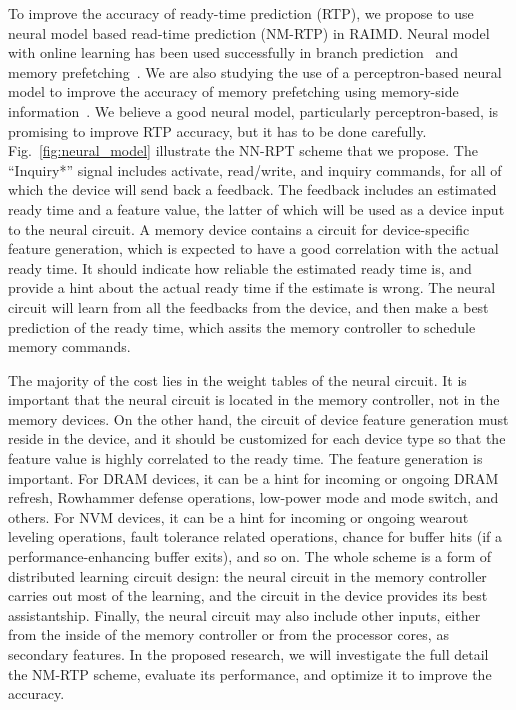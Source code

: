 \documentclass[11pt]{article}
\begin{document}
To improve the accuracy of ready-time prediction (RTP), we propose to use neural
model based read-time prediction (NM-RTP) in RAIMD.  Neural model with online
learning has been used successfully in branch prediction~\cite{} and memory
prefetching~\cite{}.  We are also studying the use of a perceptron-based neural
model to improve the accuracy of memory prefetching using memory-side
information~\cite{}.  We believe a good neural model, particularly
perceptron-based, is promising to improve RTP accuracy, but it has to be done
carefully.  Fig.~\ref{fig:neural_model} illustrate the NN-RPT scheme that we
propose.  The ``Inquiry*'' signal includes activate, read/write, and inquiry
commands, for all of which the device will send back a feedback.  The feedback
includes an estimated ready time and a feature value, the latter of which will
be used as a device input to the neural circuit.  A memory device contains a
circuit for device-specific feature generation, which is expected to have a good
correlation with the actual ready time.  It should indicate how reliable the
estimated ready time is, and provide a hint about the actual ready time if the
estimate is wrong.  The neural circuit will learn from all the feedbacks from
the device, and then make a best prediction of the ready time, which assits the
memory controller to schedule memory commands.

The majority of the cost lies in the weight tables of the neural circuit.  It is
important that the neural circuit is located in the memory controller, not in
the memory devices.  On the other hand, the circuit of device feature generation
must reside in the device, and it should be customized for each device type so
that the feature value is highly correlated to the ready time.  The feature
generation is important.  For DRAM devices, it can be a hint for incoming or
ongoing DRAM refresh, Rowhammer defense operations, low-power mode and mode
switch, and others.  For NVM devices, it can be a hint for incoming or ongoing
wearout leveling operations, fault tolerance related operations, chance for buffer
hits (if a performance-enhancing buffer exits), and so on.  The whole scheme is
a form of distributed learning circuit design: the neural circuit in the memory
controller carries out most of the learning, and the circuit in the device
provides its best assistantship.  Finally, the neural circuit may also include
other inputs, either from the inside of the memory controller or from the
processor cores, as secondary features.  In the proposed research, we will
investigate the full detail the NM-RTP scheme, evaluate its performance, and
optimize it to improve the accuracy.
\end{document}
